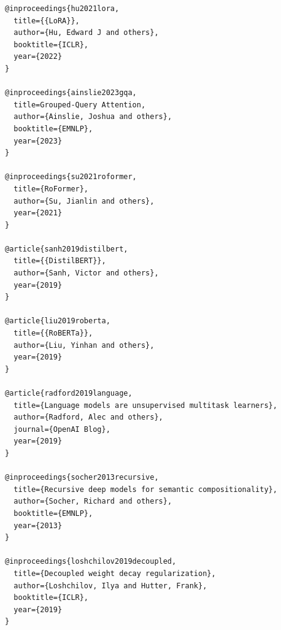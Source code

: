 \begin{lstlisting}
@inproceedings{hu2021lora,
  title={{LoRA}},
  author={Hu, Edward J and others},
  booktitle={ICLR},
  year={2022}
}

@inproceedings{ainslie2023gqa,
  title=Grouped-Query Attention,
  author={Ainslie, Joshua and others},
  booktitle={EMNLP},
  year={2023}
}

@inproceedings{su2021roformer,
  title={RoFormer},
  author={Su, Jianlin and others},
  year={2021}
}

@article{sanh2019distilbert,
  title={{DistilBERT}},
  author={Sanh, Victor and others},
  year={2019}
}

@article{liu2019roberta,
  title={{RoBERTa}},
  author={Liu, Yinhan and others},
  year={2019}
}

@article{radford2019language,
  title={Language models are unsupervised multitask learners},
  author={Radford, Alec and others},
  journal={OpenAI Blog},
  year={2019}
}

@inproceedings{socher2013recursive,
  title={Recursive deep models for semantic compositionality},
  author={Socher, Richard and others},
  booktitle={EMNLP},
  year={2013}
}

@inproceedings{loshchilov2019decoupled,
  title={Decoupled weight decay regularization},
  author={Loshchilov, Ilya and Hutter, Frank},
  booktitle={ICLR},
  year={2019}
}
\end{lstlisting}

